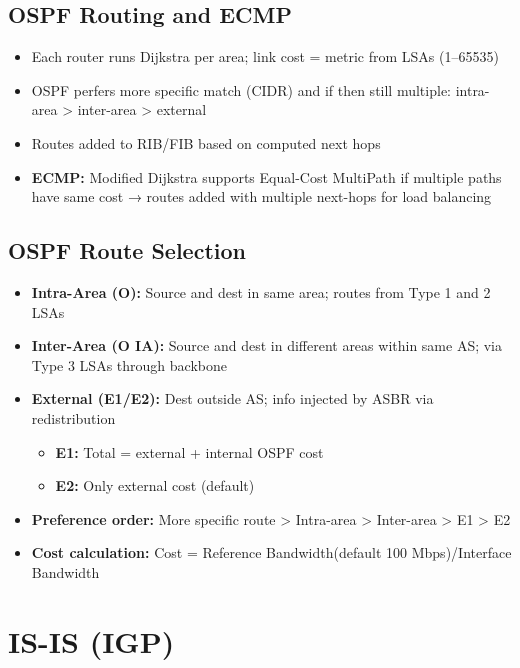 \begin{multicols*}{5}
		\subsection{OSPF Routing and ECMP}
		\begin{itemize}
			\item Each router runs Dijkstra per area; link cost = metric from LSAs (1–65535)
			\item OSPF perfers more specific match (CIDR) and if then still multiple: intra-area > inter-area > external
			\item Routes added to RIB/FIB based on computed next hops
			\item \textbf{ECMP:} Modified Dijkstra supports Equal-Cost MultiPath if multiple paths have same cost → routes added with multiple next-hops for load balancing
		\end{itemize}
		
		\subsection{OSPF Route Selection}
		\begin{itemize}
			\item \textbf{Intra-Area (O):} Source and dest in same area; routes from Type 1 and 2 LSAs
			\item \textbf{Inter-Area (O IA):} Source and dest in different areas within same AS; via Type 3 LSAs through backbone
			\item \textbf{External (E1/E2):} Dest outside AS; info injected by ASBR via redistribution
			\begin{itemize}
				\item \textbf{E1:} Total = external + internal OSPF cost
				\item \textbf{E2:} Only external cost (default)
			\end{itemize}
			\item \textbf{Preference order:} More specific route > Intra-area > Inter-area > E1 > E2
			\item \textbf{Cost calculation:} Cost = Reference Bandwidth(default 100 Mbps)/Interface Bandwidth
		\end{itemize}
		
		\section{IS-IS (IGP)}

\end{multicols*}
